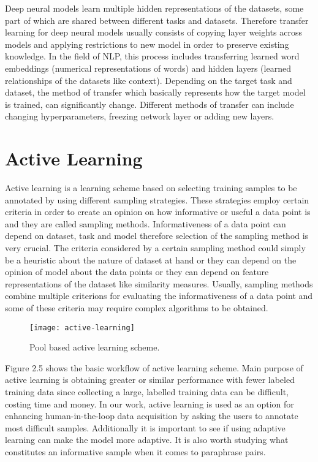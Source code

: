 Deep neural models learn multiple hidden representations of the datasets, some part of which are shared between different tasks and datasets. Therefore transfer learning for deep neural models usually consists of copying layer weights across models and applying restrictions to new model in order to preserve existing knowledge. In the field of NLP, this process includes transferring learned word embeddings (numerical representations of words) and hidden layers (learned relationships of the datasets like context). Depending on the target task and dataset, the method of transfer which basically represents how the target model is trained, can significantly change. Different methods of transfer can include changing hyperparameters, freezing network layer or adding new layers.

\section{Active Learning}

Active learning is a learning scheme based on selecting training samples to be annotated by using different sampling strategies. These strategies employ certain criteria in order to create an opinion on how informative or useful a data point is and they are called sampling methods. Informativeness of a data point can depend on dataset, task and model therefore selection of the sampling method is very crucial. The criteria considered by a certain sampling method could simply be a heuristic about the nature of dataset at hand or they can depend on the opinion of model about the data points or they can depend on feature representations of the dataset like similarity measures. Usually, sampling methods combine multiple criterions for evaluating the informativeness of a data point and some of these criteria may require complex algorithms to be obtained. 

\begin{figure}[t]
\texttt{[image: active-learning]}
\centering
\caption{Pool based active learning scheme.}
\end{figure}

Figure 2.5 shows the basic workflow of active learning scheme. Main purpose of active learning is obtaining greater or similar performance with fewer labeled training data since collecting a large, labelled training data can be difficult, costing time and money. In our work, active learning is used as an option for enhancing human-in-the-loop data acquisition by asking the users to annotate most difficult samples. Additionally it is important to see if using adaptive learning can make the model more adaptive. It is also worth studying what constitutes an informative sample when it comes to paraphrase pairs.